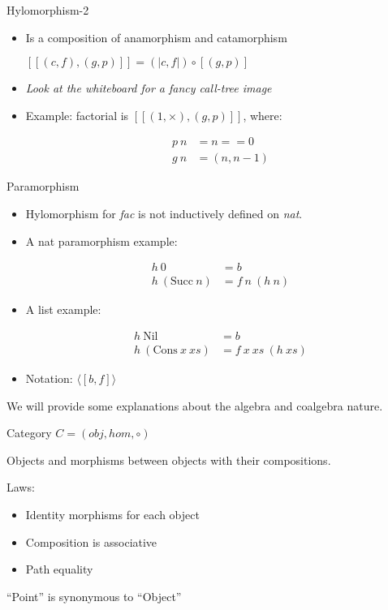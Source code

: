 \documentclass{beamer}
\begin{document}
\begin{frame}{Hylomorphism-2}
\begin{itemize}

\item Is a composition of anamorphism and catamorphism

$[\![(c,f), (g,p)]\!] = (\!|c, f|\!) \circ [\!(g, p)\!]$

\item \textit{Look at the whiteboard for a fancy call-tree image}
\item Example: factorial is $[\![(1, \times), (g,p)]\!]$, where:

\begin{align*}
p\ n &= n == 0 \\
g\ n &= (n, n-1)
\end{align*}
\end{itemize}
\end{frame}


\begin{frame}[fragile]{Paramorphism}

\begin{itemize}
\item Hylomorphism for \textit{fac }is not inductively defined on \textit{nat}.
\item A nat paramorphism example:

\begin{align*}
h\ 0&= b\\
h\ (\text{Succ} \ n ) &= f\ n\ (h\ n)
\end{align*}

\item A list example:

\begin{align*}
h\ \text{Nil}& = b\\
h\ (\text{Cons}\ x\ xs ) &= f\ x\ xs\ (h\ xs)
\end{align*}

\item Notation: $\langle\![ b, f ]\!\rangle$
\end{itemize}

\end{frame}

\begin{frame}
We will provide some explanations about the algebra and coalgebra nature.

\end{frame}

\begin{frame}{Category}
$C = (obj, hom, \circ)$

Objects and morphisms between objects with their compositions.

Laws:
\begin{itemize}
\item Identity morphisms for each object
\item Composition is associative
\item Path equality
\end{itemize}

``Point'' is synonymous to ``Object''
\end{frame}
\end{document}
